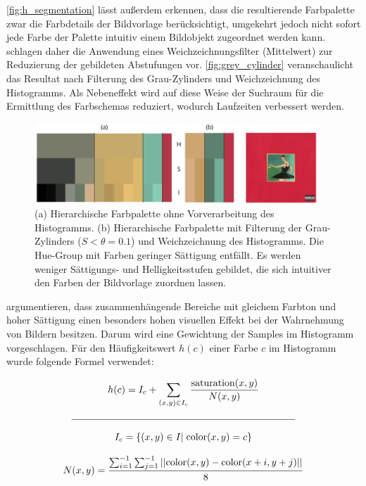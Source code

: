 \autoref{fig:h_segmentation} lässt außerdem erkennen, dass die resultierende Farbpalette zwar die Farbdetails der Bildvorlage berücksichtigt, umgekehrt jedoch nicht sofort jede Farbe der Palette intuitiv einem Bildobjekt zugeordnet werden kann. \citet{image-based-schemes} schlagen daher die Anwendung eines Weichzeichnungsfilter (Mittelwert) zur Reduzierung der gebildeten Abstufungen vor. \autoref{fig:grey_cylinder} veranschaulicht das Resultat nach Filterung des Grau-Zylinders und Weichzeichnung des Histogramms. Als Nebeneffekt wird auf diese Weise der Suchraum für die Ermittlung des Farbschemas reduziert, wodurch Laufzeiten verbessert werden.

\begin{figure}[]
\centering
\includegraphics[width=0.95\textwidth]{img/grey_cylinder.png}
\caption{(a) Hierarchische Farbpalette ohne Vorverarbeitung des Histogramms. (b) Hierarchische Farbpalette mit Filterung der Grau-Zylinders ($S < \theta = 0.1$) und Weichzeichnung des Histogramms. Die Hue-Group mit Farben geringer Sättigung entfällt. Es werden weniger Sättigungs- und Helligkeitsstufen gebildet, die sich intuitiver den Farben der Bildvorlage zuordnen lassen.}
\label{fig:grey_cylinder}
\end{figure}

\citet{image-based-schemes} argumentieren, dass zusammenhängende Bereiche mit gleichem Farbton und hoher Sättigung einen besonders hohen visuellen Effekt bei der Wahrnehmung von Bildern besitzen. Darum wird eine Gewichtung der Samples im Histogramm vorgeschlagen. Für den Häufigkeitswert $h(c)$ einer Farbe $c$ im Histogramm wurde folgende Formel verwendet:

\begin{equation}
\label{eq:weight}
\begin{gathered}
	h(c) = I_c + \sum_{(x, y) \in I_c} \frac{ \text{saturation}(x, y) }{ N(x, y) }\\
  \mathclap{\rule{8cm}{0.4pt}}\\[2mm] 
  I_c = \{ (x, y) \in I |\; \text{color}(x, y) = c\} \\[3mm] 
  N(x, y) = \frac{ \sum_{i=1}^{-1} \sum_{j=1}^{-1} ||\text{color}(x, y) - \text{color}(x+i, y+j)||}{8}
\end{gathered}
\end{equation}

